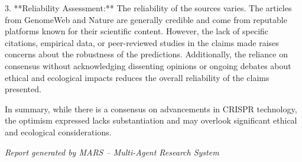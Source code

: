 \documentclass[11pt,a4paper]{article}
\begin{document}
3. **Reliability Assessment:**
   The reliability of the sources varies. The articles from GenomeWeb and Nature are generally credible and come from reputable platforms known for their scientific content. However, the lack of specific citations, empirical data, or peer-reviewed studies in the claims made raises concerns about the robustness of the predictions. Additionally, the reliance on consensus without acknowledging dissenting opinions or ongoing debates about ethical and ecological impacts reduces the overall reliability of the claims presented. 

In summary, while there is a consensus on advancements in CRISPR technology, the optimism expressed lacks substantiation and may overlook significant ethical and ecological considerations.

\vfill

\hrulefill

\begin{center}
\textit{Report generated by MARS -- Multi-Agent Research System}
\end{center}
\end{document}

